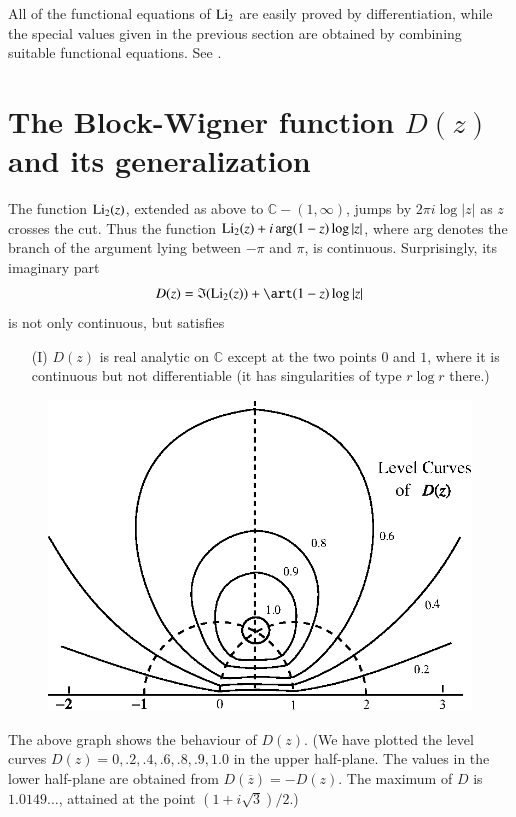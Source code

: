 All of the functional equations of $\operatorname{Li}_{2}$ are easily proved by differentiation, while the special values given in the previous section are obtained by combining suitable functional equations. See \cite{art15-cite4}.

\section{The Block-Wigner function $D(z)$ and its generalization}\label{art15-sec3}
The function $\operatorname{Li}_{2}(z)$, extended as above to $\mathbb{C}-(1,\infty)$, jumps by $2\pi i\log |z|$ as $z$ crosses the cut. Thus the function $\operatorname{Li}_{2}(z)+i\arg (1-z)\log |z|$, where arg denotes the branch of the argument lying between $-\pi$ and $\pi$, is continuous. Surprisingly, its imaginary part
$$
D(z)=\mathfrak{I}(\Li_{2}(z))+\art(1-z)\log |z|
$$
is not only continuous, but satisfies
\begin{itemize}
\item[(I)] $D(z)$ is real analytic on $\mathbb{C}$ except at the two points $0$ and $1$, where it is continuous but not differentiable (it has singularities of type $r\log r$ there.)
\end{itemize}
\begin{figure}[H]
\centering
\includegraphics{figures/fig3.eps}
\end{figure}\pageoriginale

The above graph shows the behaviour of $D(z)$. (We have plotted the level curves $D(z)=0,.2,.4,.6,.8,.9,1.0$ in the upper half-plane. The values in the lower half-plane are obtained from $D(\overline{z})=-D(z)$. The maximum of $D$ is $1.0149\ldots$, attained at the point $(1+i\sqrt{3})/2$.)

